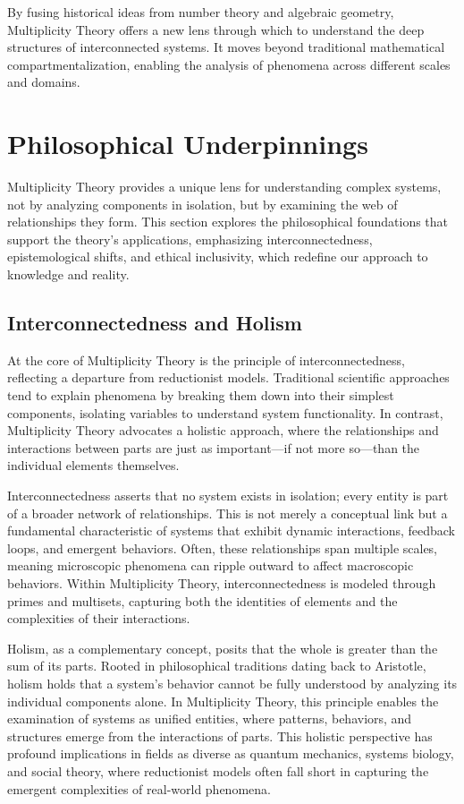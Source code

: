 \documentclass[12pt]{article}
\begin{document}
By fusing historical ideas from number theory and algebraic geometry, Multiplicity Theory offers a new lens through which to understand the deep structures of interconnected systems. It moves beyond traditional mathematical compartmentalization, enabling the analysis of phenomena across different scales and domains.

\section{Philosophical Underpinnings}

Multiplicity Theory provides a unique lens for understanding complex systems, not by analyzing components in isolation, but by examining the web of relationships they form. This section explores the philosophical foundations that support the theory’s applications, emphasizing interconnectedness, epistemological shifts, and ethical inclusivity, which redefine our approach to knowledge and reality.

\subsection{Interconnectedness and Holism}

At the core of Multiplicity Theory is the principle of interconnectedness, reflecting a departure from reductionist models. Traditional scientific approaches tend to explain phenomena by breaking them down into their simplest components, isolating variables to understand system functionality. In contrast, Multiplicity Theory advocates a holistic approach, where the relationships and interactions between parts are just as important—if not more so—than the individual elements themselves.

Interconnectedness asserts that no system exists in isolation; every entity is part of a broader network of relationships. This is not merely a conceptual link but a fundamental characteristic of systems that exhibit dynamic interactions, feedback loops, and emergent behaviors. Often, these relationships span multiple scales, meaning microscopic phenomena can ripple outward to affect macroscopic behaviors. Within Multiplicity Theory, interconnectedness is modeled through primes and multisets, capturing both the identities of elements and the complexities of their interactions.

Holism, as a complementary concept, posits that the whole is greater than the sum of its parts. Rooted in philosophical traditions dating back to Aristotle, holism holds that a system's behavior cannot be fully understood by analyzing its individual components alone. In Multiplicity Theory, this principle enables the examination of systems as unified entities, where patterns, behaviors, and structures emerge from the interactions of parts. This holistic perspective has profound implications in fields as diverse as quantum mechanics, systems biology, and social theory, where reductionist models often fall short in capturing the emergent complexities of real-world phenomena.
\end{document}
